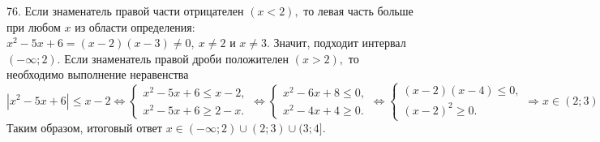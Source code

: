 76. Если знаменатель правой части отрицателен $(x<2),$ то левая часть больше при любом $x$ из области определения: $x^2-5x+6=(x-2)(x-3)\neq0,\ x\neq2$ и $x\neq3.$ Значит, подходит интервал $(-\infty;2).$ Если знаменатель правой дроби положителен $(x>2),$ то необходимо выполнение неравенства $|x^2-5x+6|\leqslant x-2\Leftrightarrow \begin{cases} x^2-5x+6\leqslant x-2,\\ x^2-5x+6\geqslant 2-x.\end{cases}\Leftrightarrow \begin{cases} x^2-6x+8\leqslant0,\\ x^2-4x+4\geqslant0.\end{cases}
\Leftrightarrow \begin{cases} (x-2)(x-4)\leqslant0,\\ (x-2)^2\geqslant0.\end{cases}\Rightarrow x\in(2;3)\cup(3;4].$ Таким образом, итоговый ответ $x\in(-\infty;2)\cup (2;3)\cup(3;4].$\newpage\noindent
